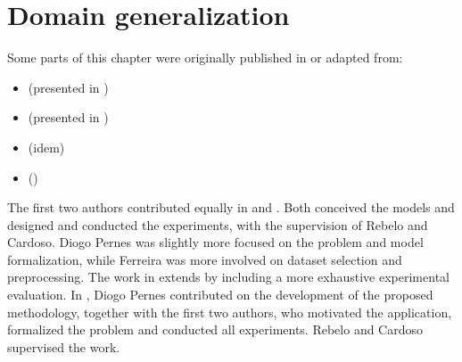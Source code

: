 
\chapter{Domain generalization}


\label{chp:domain_generalization}


\begin{tcolorbox}
    \small{
    Some parts of this chapter were originally published in or adapted from:
    \begin{itemize}
        \item[] \cite{DeSIRe}  (presented in )
        \item[] \cite{AdvSInvConf}  (presented in )
        \item[] \cite{AdvSInvJournal}  (idem)
        \item[] \cite{AdvInvAttack}  ()
    \end{itemize}

    The first two authors contributed equally in \cite{DeSIRe} and \cite{AdvSInvConf}. Both conceived the models and designed and conducted the experiments, with the supervision of Rebelo and Cardoso. Diogo Pernes was slightly more focused on the problem and model formalization, while Ferreira was more involved on dataset selection and preprocessing. The work in \cite{AdvSInvJournal} extends \cite{AdvSInvConf} by including a more exhaustive experimental evaluation. In \cite{AdvInvAttack}, Diogo Pernes contributed on the development of the proposed methodology, together with the first two authors, who motivated the application, formalized the problem and conducted all experiments. Rebelo and Cardoso supervised the work.
    }
\end{tcolorbox}

